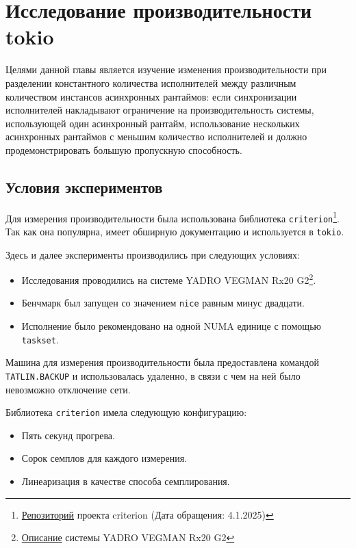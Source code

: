 
\section{Исследование производительности tokio}

Целями данной главы является изучение изменения производительности при разделении константного количества исполнителей между различным количеством инстансов асинхронных рантаймов: если синхронизации исполнителей накладывают ограничение на производительность системы, использующей один асинхронный рантайм, использование нескольких асинхронных рантаймов с меньшим количество исполнителей и должно продемонстрировать большую пропускную способность.

\subsection{Условия экспериментов}\label{experiment_environment}

Для измерения производительности была использована библиотека \verb|criterion|\footnote{\href{https://github.com/bheisler/criterion.rs}{Репозиторий} проекта criterion (Дата обращения: 4.1.2025)}. Так как она популярна, имеет обширную документацию и используется в \verb|tokio|.

Здесь и далее эксперименты производились при следующих условиях:

\begin{itemize}
    \item Исследования проводились на системе YADRO VEGMAN Rx20 G2\footnote{\href{https://yadro.com/ru/vegman/rx20g2/specs}{Описание} системы YADRO VEGMAN Rx20 G2}.
    \item Бенчмарк был запущен со значением \verb|nice| равным минус двадцати.
    \item Исполнение было рекомендовано на одной NUMA единице с помощью \verb|taskset|.
\end{itemize}

Машина для измерения производительности была предоставлена командой \verb|TATLIN.BACKUP| и использовалась удаленно, в связи с чем на ней было невозможно отключение сети.

Библиотека \verb|criterion| имела следующую конфигурацию:

\begin{itemize}
    \item Пять секунд прогрева.
    \item Сорок семплов для каждого измерения.
    \item Линеаризация в качестве способа семплирования.
\end{itemize}

